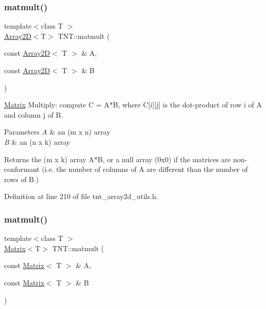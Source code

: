 \subsubsection{\texorpdfstring{matmult()}{matmult()}\hspace{0.1cm}{\footnotesize\ttfamily [1/4]}}
{\footnotesize\ttfamily template$<$class T $>$ \\
\hyperlink{classTNT_1_1Array2D}{Array2D}$<$T$>$ T\+N\+T\+::matmult (\begin{DoxyParamCaption}\item[{const \hyperlink{classTNT_1_1Array2D}{Array2D}$<$ T $>$ \&}]{A,  }\item[{const \hyperlink{classTNT_1_1Array2D}{Array2D}$<$ T $>$ \&}]{B }\end{DoxyParamCaption})}



\hyperlink{classTNT_1_1Matrix}{Matrix} Multiply\+: compute C = A$\ast$B, where C\mbox{[}i\mbox{]}\mbox{[}j\mbox{]} is the dot-\/product of row i of A and column j of B. 


\begin{DoxyParams}{Parameters}
{\em A} & an (m x n) array \\
\hline
{\em B} & an (n x k) array \\
\hline
\end{DoxyParams}
\begin{DoxyReturn}{Returns}
the (m x k) array A$\ast$B, or a null array (0x0) if the matrices are non-\/conformant (i.\+e. the number of columns of A are different than the number of rows of B.) 
\end{DoxyReturn}


Definition at line 210 of file tnt\+\_\+array2d\+\_\+utils.\+h.

\mbox{\label{namespaceTNT_a53e97abb43a5114bbcdc7d2687b19349}} 
\subsubsection{\texorpdfstring{matmult()}{matmult()}\hspace{0.1cm}{\footnotesize\ttfamily [2/4]}}
{\footnotesize\ttfamily template$<$class T $>$ \\
\hyperlink{classTNT_1_1Matrix}{Matrix}$<$T$>$ T\+N\+T\+::matmult (\begin{DoxyParamCaption}\item[{const \hyperlink{classTNT_1_1Matrix}{Matrix}$<$ T $>$ \&}]{A,  }\item[{const \hyperlink{classTNT_1_1Matrix}{Matrix}$<$ T $>$ \&}]{B }\end{DoxyParamCaption})\hspace{0.3cm}{\ttfamily [inline]}}




